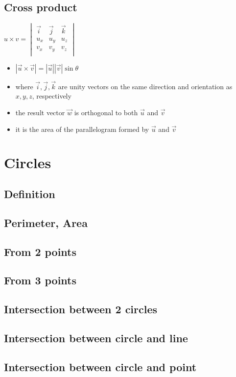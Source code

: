 \subsection{Cross product}

$
            u\times v = \begin{vmatrix}
                \vec{i} & \vec{j} & \vec{k} \\
                u_x & u_y & u_z \\
                v_x & v_y & v_z \\
            \end{vmatrix}
$
\begin{itemize}
\item $|\vec{u}\times \vec{v}| = |\vec{u}||\vec{v}|\sin \theta$
\item where $\vec{i}, \vec{j}, \vec{k}$ are unity vectors on the same direction and orientation as $x, y, z$, respectively
\item the result vector $\vec{w}$ is orthogonal to both $\vec{u}$ and $\vec{v}$
\item it is the area of the parallelogram formed by $\vec{u}$ and $\vec{v}$
\end{itemize}


\section{Circles}

\subsection{Definition}

\subsection{Perimeter, Area}

\subsection{From 2 points}

\subsection{From 3 points}

\subsection{Intersection between 2 circles}

\subsection{Intersection between circle and line}

\subsection{Intersection between circle and point}

\clearpage
